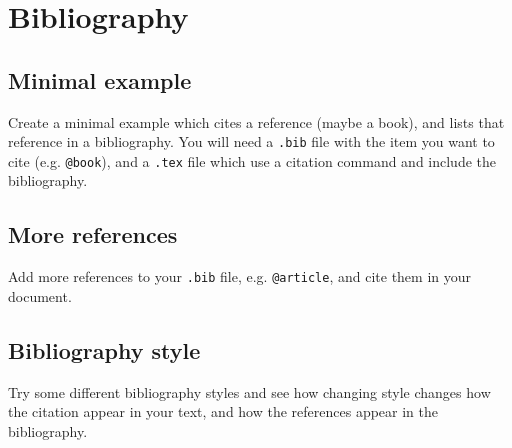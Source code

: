 \documentclass[a4paper, 12pt]{article}
\begin{document}
\section{Bibliography}
\subsection{Minimal example}
Create a minimal example which cites a reference (maybe a book), and lists that reference in a bibliography. You will need a \verb!.bib! file with the item you want to cite (e.g. \verb!@book!), and a \verb!.tex! file which use a citation command and include the bibliography.


\subsection{More references}
Add more references to your \verb!.bib! file, e.g. \verb!@article!, and cite them in your document.

\subsection{Bibliography style}
Try some different bibliography styles and see how changing style changes how the citation appear in your text, and how the references appear in the bibliography.
\end{document}
